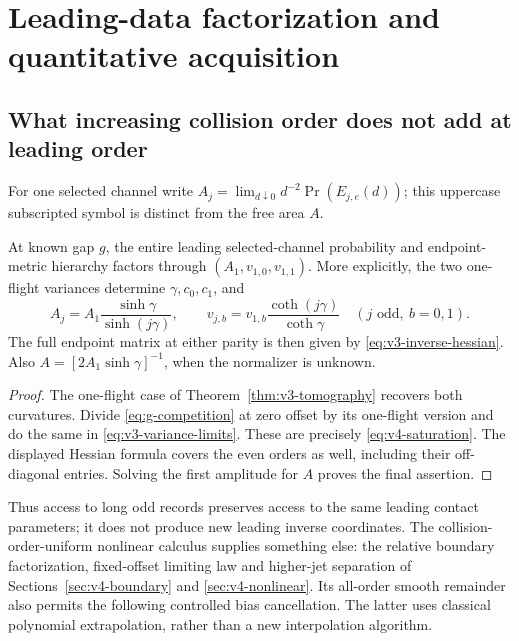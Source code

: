 \section{Leading-data factorization and quantitative acquisition}
\label{sec:v4-acquisition}
\subsection{What increasing collision order does not add at leading order}
For one selected channel write
$A_j=\lim_{d\downarrow0}d^{-2}\Pr(E_{j,e}(d))$; this uppercase
subscripted symbol is distinct from the free area $A$.

\begin{proposition}
\label{prop:v4-saturation}
At known gap $g$, the entire leading selected-channel probability and
endpoint-metric hierarchy factors through
$(A_1,v_{1,0},v_{1,1})$. More explicitly, the two one-flight variances
determine $\gamma,c_0,c_1$, and
\begin{equation}\label{eq:v4-saturation}
 A_j=A_1\frac{\sinh\gamma}{\sinh(j\gamma)},\qquad
 v_{j,b}=v_{1,b}\frac{\coth(j\gamma)}{\coth\gamma}
       \quad(j\text{ odd},\ b=0,1).
\end{equation}
The full endpoint matrix at either parity is then given by
\eqref{eq:v3-inverse-hessian}. Also
$A=[2A_1\sinh\gamma]^{-1}$, when the normalizer is unknown.
\end{proposition}
\begin{proof}
The one-flight case of Theorem~\ref{thm:v3-tomography} recovers both
curvatures. Divide \eqref{eq:g-competition} at zero offset by its
one-flight version and do the same in
\eqref{eq:v3-variance-limits}. These are precisely
\eqref{eq:v4-saturation}. The displayed Hessian formula covers the
even orders as well, including their off-diagonal entries. Solving
the first amplitude for $A$ proves the final assertion.
\end{proof}

Thus access to long odd records preserves access to the same leading
contact parameters; it does not produce new leading inverse coordinates.
The collision-order-uniform nonlinear calculus supplies something
else: the relative boundary factorization, fixed-offset limiting law
and higher-jet separation of Sections~\ref{sec:v4-boundary} and
\ref{sec:v4-nonlinear}. Its all-order smooth remainder also permits
the following controlled bias cancellation. The latter uses classical
polynomial extrapolation, rather than a new interpolation algorithm.


